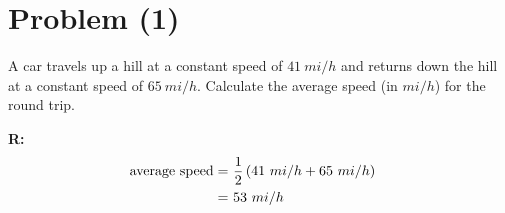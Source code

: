 \section{Problem (1)}
	A car travels up a hill at a constant speed of $41 \ mi/h$ and returns down the hill at a constant speed of $65 \ mi/h$. Calculate the average speed (in $mi/h$) for the round trip.

	\textbf{R:} \newline
	\begin{align}
		\text{average speed} = \ &\frac{1}{2}\left( 41 \ mi/h + 65 \ mi/h \right)& \notag \\
		= \ &53 \ mi/h&
	\end{align}

